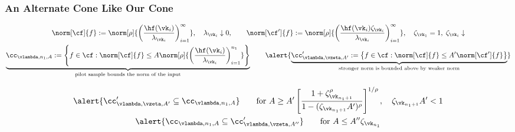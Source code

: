 \documentclass[10pt,compress,xcolor={usenames,dvipsnames},aspectratio=169]{beamer}
\begin{document}
\begin{frame}
	\frametitle{An Alternate Cone Like Our Cone}
	\vspace{-5.5ex}
	\begin{gather*}
	\norm[\cf]{f} : = \norm[\rho]{\biggl ( \frac{\hf(\vk_i) }{\lambda_{\vk_i}} \biggr) _{i=1}^\infty}, \quad \lambda_{\vk_i} \downarrow 0, \qquad
	\norm[\cf']{f} : = \norm[\rho]{\biggl ( \frac{\hf(\vk_i) \zeta_{\vk_i}}{\lambda_{\vk_i}} \biggr) _{i=1}^\infty},  
	\quad \zeta_{\vk_1} = 1, \; \zeta_{\vk_i} \downarrow
\\
	\underbrace{\cc_{\vlambda, n_1, A} : = \Biggl\{ f \in \cf : \norm[\cf]{f} \le A\norm[\rho]{\biggl ( \frac{\hf(\vk_i) }{\lambda_{\vk_i}} \biggr) _{i=1}^{n_1}} \Biggr\} }_{\text{pilot sample bounds the norm of the input}}
	\qquad 
	\alert{\underbrace{\cc'_{\vlambda, \vzeta, A'} : = \bigl \{ f \in \cf : \norm[\cf]{f} \le A'\norm[\cf']{f} \bigr \} }_{\text{stronger norm is bounded above by weaker norm}}}
	\end{gather*}

		\begin{gather*}
\alert{\cc'_{\vlambda, \vzeta, A'} \subseteq \cc_{\vlambda, n_1, A}}  \qquad 
\text{for } A \ge A'\left[\frac{1 + \zeta_{\vk_{n_1+1}}^\rho}{1 - (\zeta_{\vk_{n_1+1}}A')^\rho}\right]^{1/\rho},  \quad \zeta_{\vk_{n_1+1}}A' < 1  \\
\alert{\cc_{\vlambda, n_1, A} \subseteq \cc'_{\vlambda, \vzeta, A''} }  \qquad 
\text{for } A \le A'' \zeta_{\vk_{n_1}}
		\end{gather*}

\end{frame}
\end{document}
